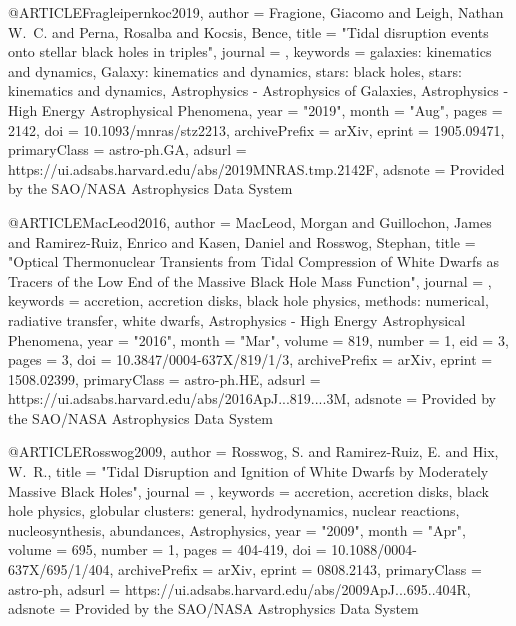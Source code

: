 \documentclass[twocolumn,tighten]{aastex63}
\begin{document}
{{{{{{@ARTICLE{Fragleipernkoc2019,
       author = {{Fragione}, Giacomo and {Leigh}, Nathan W.~C. and {Perna}, Rosalba and
         {Kocsis}, Bence},
        title = "{Tidal disruption events onto stellar black holes in triples}",
      journal = {\mnras},
     keywords = {galaxies: kinematics and dynamics, Galaxy: kinematics and dynamics, stars: black holes, stars: kinematics and dynamics, Astrophysics - Astrophysics of Galaxies, Astrophysics - High Energy Astrophysical Phenomena},
         year = "2019",
        month = "Aug",
        pages = {2142},
          doi = {10.1093/mnras/stz2213},
archivePrefix = {arXiv},
       eprint = {1905.09471},
 primaryClass = {astro-ph.GA},
       adsurl = {https://ui.adsabs.harvard.edu/abs/2019MNRAS.tmp.2142F},
      adsnote = {Provided by the SAO/NASA Astrophysics Data System}
}

@ARTICLE{MacLeod2016,
       author = {{MacLeod}, Morgan and {Guillochon}, James and {Ramirez-Ruiz}, Enrico and
         {Kasen}, Daniel and {Rosswog}, Stephan},
        title = "{Optical Thermonuclear Transients from Tidal Compression of White Dwarfs as Tracers of the Low End of the Massive Black Hole Mass Function}",
      journal = {\apj},
     keywords = {accretion, accretion disks, black hole physics, methods: numerical, radiative transfer, white dwarfs, Astrophysics - High Energy Astrophysical Phenomena},
         year = "2016",
        month = "Mar",
       volume = {819},
       number = {1},
          eid = {3},
        pages = {3},
          doi = {10.3847/0004-637X/819/1/3},
archivePrefix = {arXiv},
       eprint = {1508.02399},
 primaryClass = {astro-ph.HE},
       adsurl = {https://ui.adsabs.harvard.edu/abs/2016ApJ...819....3M},
      adsnote = {Provided by the SAO/NASA Astrophysics Data System}
}

@ARTICLE{Rosswog2009,
       author = {{Rosswog}, S. and {Ramirez-Ruiz}, E. and {Hix}, W.~R.},
        title = "{Tidal Disruption and Ignition of White Dwarfs by Moderately Massive Black Holes}",
      journal = {\apj},
     keywords = {accretion, accretion disks, black hole physics, globular clusters: general, hydrodynamics, nuclear reactions, nucleosynthesis, abundances, Astrophysics},
         year = "2009",
        month = "Apr",
       volume = {695},
       number = {1},
        pages = {404-419},
          doi = {10.1088/0004-637X/695/1/404},
archivePrefix = {arXiv},
       eprint = {0808.2143},
 primaryClass = {astro-ph},
       adsurl = {https://ui.adsabs.harvard.edu/abs/2009ApJ...695..404R},
      adsnote = {Provided by the SAO/NASA Astrophysics Data System}
}

}}}}}}
\end{document}
